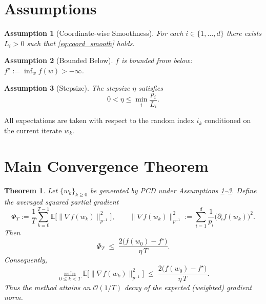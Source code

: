 \documentclass{article}
\newtheorem{theorem}{Theorem}[section]
\newtheorem{assumption}{Assumption}[section]
\begin{document}
\section*{Assumptions}
\begin{assumption}[Coordinate‑wise Smoothness]
\label{as:smooth}
For each $i\in\{1,\dots,d\}$ there exists $L_i>0$ such that \eqref{eq:coord_smooth} holds.
\end{assumption}

\begin{assumption}[Bounded Below]
\label{as:lower}
$f$ is bounded from below: $f^\star:=\inf_{w}f(w)>-\infty$.
\end{assumption}

\begin{assumption}[Stepsize]
\label{as:stepsize}
The stepsize $\eta$ satisfies
\[
0<\eta\le \min_{i}\frac{p_i}{L_i}.
\]
\end{assumption}

All expectations are taken with respect to the random index $i_k$ conditioned on the current iterate $w_k$.

\section*{Main Convergence Theorem}
\begin{theorem}
\label{thm:main}
Let $\{w_k\}_{k\ge0}$ be generated by PCD under Assumptions \ref{as:smooth}–\ref{as:stepsize}. Define the averaged squared partial gradient
\[
\Phi_T:=\frac{1}{T}\sum_{k=0}^{T-1}\mathbb{E}\!\bigl[\|\nabla f(w_k)\|_{p^{-1}}^{2}\bigr],
\qquad 
\|\nabla f(w_k)\|_{p^{-1}}^{2}:=\sum_{i=1}^{d}\frac{1}{p_i}\bigl(\partial_i f(w_k)\bigr)^{2}.
\]
Then
\begin{equation}
\label{eq:rate}
\Phi_T\;\le\;
\frac{2\bigl(f(w_0)-f^\star\bigr)}{\eta\,T}.
\end{equation}
Consequently,
\[
\min_{0\le k<T}\mathbb{E}\!\bigl[\|\nabla f(w_k)\|_{p^{-1}}^{2}\bigr]\;\le\;\frac{2\bigl(f(w_0)-f^\star\bigr)}{\eta\,T}.
\]
Thus the method attains an $\mathcal{O}(1/T)$ decay of the expected (weighted) gradient norm.
\end{theorem}

\end{document}
